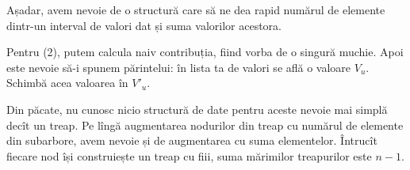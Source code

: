 \documentclass[../main.tex]{subfiles}
\begin{document}
Așadar, avem nevoie de o structură care să ne dea rapid numărul de elemente dintr-un interval de valori dat și suma valorilor acestora.

Pentru (2), putem calcula naiv contribuția, fiind vorba de o singură muchie. Apoi este nevoie să-i spunem părintelui: în lista ta de valori se află o valoare $V_u$. Schimbă acea valoarea în $V'_u$.

Din păcate, nu cunosc nicio structură de date pentru aceste nevoie mai simplă decît un treap. Pe lîngă augmentarea nodurilor din treap cu numărul de elemente din subarbore, avem nevoie și de augmentarea cu suma elementelor. Întrucît fiecare nod își construiește un treap cu fiii, suma mărimilor treapurilor este $n - 1$.
\end{document}
